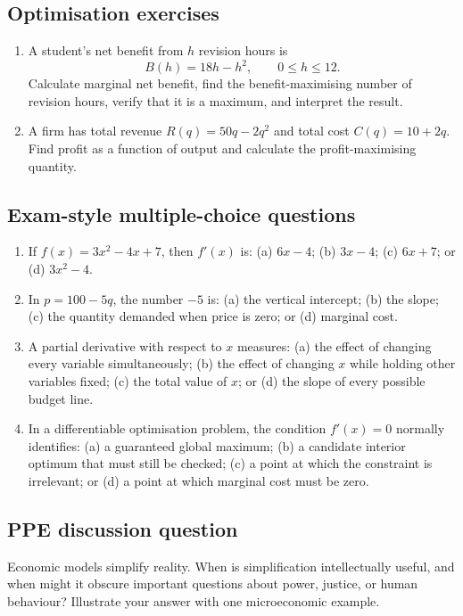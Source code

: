 \subsection*{Optimisation exercises}
\begin{enumerate}[resume,label=\arabic*.]
  \item A student's net benefit from $h$ revision hours is
  \[
  B(h)=18h-h^2,\qquad 0\leq h\leq12.
  \]
  Calculate marginal net benefit, find the benefit-maximising number of revision hours, verify that it is a maximum, and interpret the result.
  \item A firm has total revenue $R(q)=50q-2q^2$ and total cost $C(q)=10+2q$. Find profit as a function of output and calculate the profit-maximising quantity.
\end{enumerate}

\subsection*{Exam-style multiple-choice questions}
\begin{enumerate}[resume,label=\arabic*.]
  \item If $f(x)=3x^2-4x+7$, then $f'(x)$ is: (a) $6x-4$; (b) $3x-4$; (c) $6x+7$; or (d) $3x^2-4$.
  \item In $p=100-5q$, the number $-5$ is: (a) the vertical intercept; (b) the slope; (c) the quantity demanded when price is zero; or (d) marginal cost.
  \item A partial derivative with respect to $x$ measures: (a) the effect of changing every variable simultaneously; (b) the effect of changing $x$ while holding other variables fixed; (c) the total value of $x$; or (d) the slope of every possible budget line.
  \item In a differentiable optimisation problem, the condition $f'(x)=0$ normally identifies: (a) a guaranteed global maximum; (b) a candidate interior optimum that must still be checked; (c) a point at which the constraint is irrelevant; or (d) a point at which marginal cost must be zero.
\end{enumerate}

\subsection*{PPE discussion question}

\noindent Economic models simplify reality. When is simplification intellectually useful, and when might it obscure important questions about power, justice, or human behaviour? Illustrate your answer with one microeconomic example.
